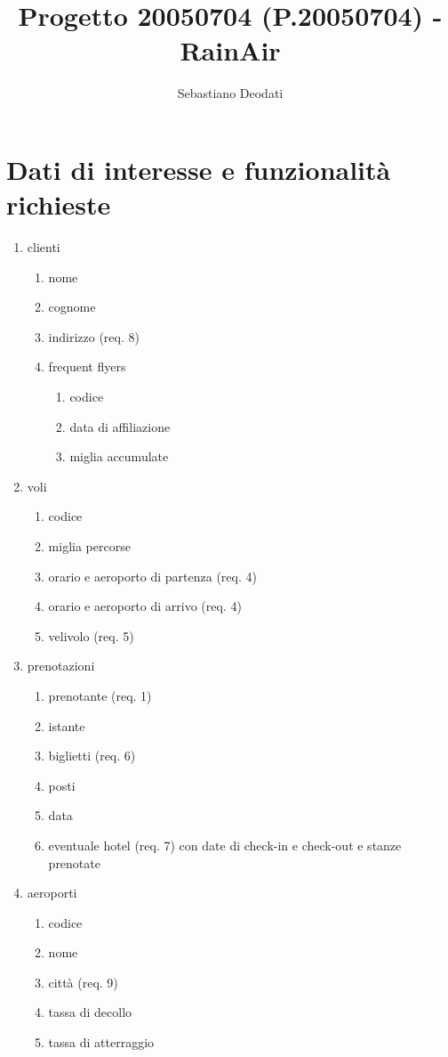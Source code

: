 \documentclass[a4paper,12pt]{report}
\title{Progetto 20050704 (P.20050704) - RainAir}
\author{Sebastiano Deodati}
\begin{document}
  \maketitle
  \tableofcontents

  \chapter{Dati di interesse e funzionalità richieste}
    \begin{enumerate}[label=\arabic*.]
      \item clienti
      \begin{enumerate}[label*=\arabic*.]
          \item nome
          \item cognome
          \item indirizzo (req. 8)
          \item frequent flyers
          \begin{enumerate}[label*=\arabic*.]
              \item codice
              \item data di affiliazione
              \item miglia accumulate
          \end{enumerate}
      \end{enumerate}
      \item voli
      \begin{enumerate}[label*=\arabic*.]
          \item codice
          \item miglia percorse
          \item orario e aeroporto di partenza (req. 4)
          \item orario e aeroporto di arrivo (req. 4)
          \item velivolo (req. 5)
      \end{enumerate}
      \item prenotazioni
      \begin{enumerate}[label*=\arabic*.]
          \item prenotante (req. 1)
          \item istante
          \item biglietti (req. 6)
          \item posti
          \item data
          \item eventuale hotel (req. 7) con date di check-in e check-out e stanze prenotate
      \end{enumerate}
      \item aeroporti
      \begin{enumerate}[label*=\arabic*.]
          \item codice
          \item nome
          \item città (req. 9)
          \item tassa di decollo
          \item tassa di atterraggio
      \end{enumerate}


\end{enumerate}
\end{document}

